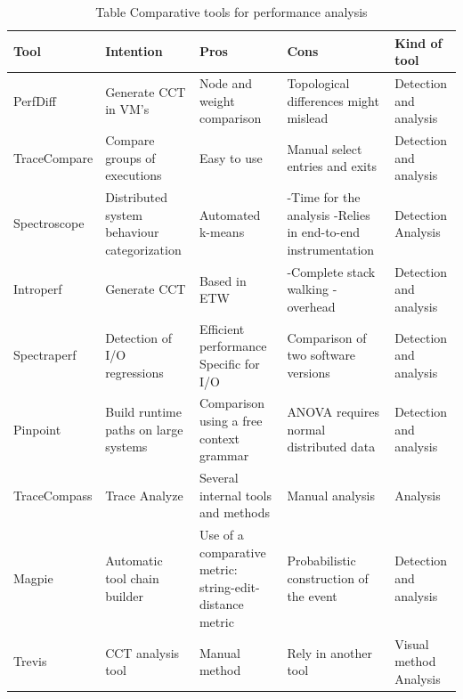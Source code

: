  \begin{table}[h]
\centering
\caption{Table Comparative tools for performance analysis}
\label{tab:tableComparative}
\begin{tabular}{lllll}
\hline
Tool             &    Intention & Pros & Cons & Kind of tool   \\ \hline
PerfDiff &  Generate CCT in VM’s & Node and weight comparison & Topological differences might mislead & Detection and analysis \\
\hline
TraceCompare & Compare groups of executions & Easy to use  & Manual select entries and exits & Detection and analysis\\ \hline
Spectroscope & Distributed system behaviour categorization & Automated k-means & -Time for the analysis -Relies in end-to-end instrumentation  & Detection Analysis\\\hline
Introperf &  Generate CCT & Based in ETW  & -Complete stack walking -overhead & Detection and analysis
\\ \hline
 
Spectraperf \cite{SPECTRAPERF} &  Detection of I/O regressions & Efficient performance Specific for I/O &  Comparison of two software versions & Detection and analysis
\\ \hline
Pinpoint &  Build runtime paths on large systems & Comparison using a free context grammar & ANOVA requires normal distributed data & Detection and analysis\\ \hline
TraceCompass &  Trace Analyze &  Several internal tools and methods & Manual analysis & Analysis \\ \hline 
Magpie & Automatic tool chain builder & Use of a comparative metric: string-edit-distance metric & Probabilistic construction of the event & Detection and analysis\\ \hline 
Trevis &  CCT analysis tool & Manual method & Rely in another tool & Visual method Analysis 
\end{tabular}
\end{table}

